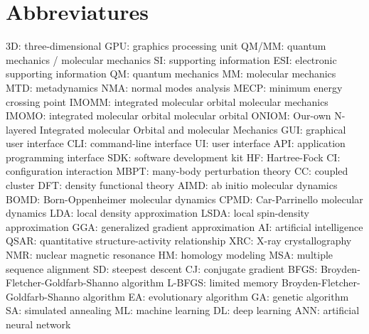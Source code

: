 \section{Abbreviatures}

3D: three-dimensional
GPU: graphics processing unit
QM/MM: quantum mechanics / molecular mechanics
SI: supporting information
ESI: electronic supporting information
QM: quantum mechanics
MM: molecular mechanics
MTD: metadynamics
NMA: normal modes analysis
MECP: minimum energy crossing point
IMOMM: integrated molecular orbital molecular mechanics
IMOMO: integrated molecular orbital molecular orbital
ONIOM: Our-own N-layered Integrated molecular Orbital and molecular Mechanics
GUI: graphical user interface
CLI: command-line interface
UI: user interface
API: application programming interface
SDK: software development kit
HF: Hartree-Fock
CI: configuration interaction
MBPT: many-body perturbation theory
CC: coupled cluster
DFT: density functional theory
AIMD: ab initio molecular dynamics
BOMD: Born-Oppenheimer molecular dynamics
CPMD: Car-Parrinello molecular dynamics
LDA: local density approximation
LSDA: local spin-density approximation
GGA: generalized gradient approximation
AI: artificial intelligence
QSAR: quantitative structure-activity relationship
XRC: X-ray crystallography
NMR: nuclear magnetic resonance
HM: homology modeling
MSA: multiple sequence alignment
SD: steepest descent
CJ: conjugate gradient
BFGS: Broyden-Fletcher-Goldfarb-Shanno algorithm
L-BFGS: limited memory Broyden-Fletcher-Goldfarb-Shanno algorithm
EA: evolutionary algorithm
GA: genetic algorithm
SA: simulated annealing
ML: machine learning
DL: deep learning
ANN: artificial neural network

